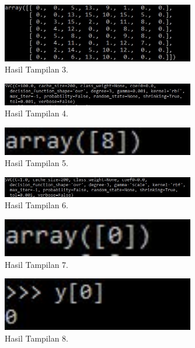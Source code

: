\begin{figure}[ht]\centerline{\includegraphics[width=0.75\textwidth]{figures/huda/12.JPG}}\caption{Hasil Tampilan 3.}\end{figure}
\begin{figure}[ht]\centerline{\includegraphics[width=0.75\textwidth]{figures/huda/13.JPG}}\caption{Hasil Tampilan 4.}\end{figure}
\begin{figure}[ht]\centerline{\includegraphics[width=0.75\textwidth]{figures/huda/14.JPG}}\caption{Hasil Tampilan 5.}\end{figure}
\begin{figure}[ht]\centerline{\includegraphics[width=0.75\textwidth]{figures/huda/15.JPG}}\caption{Hasil Tampilan 6.}\end{figure}
\begin{figure}[ht]\centerline{\includegraphics[width=0.75\textwidth]{figures/huda/16.JPG}}\caption{Hasil Tampilan 7.}\end{figure}
\begin{figure}[ht]\centerline{\includegraphics[width=0.75\textwidth]{figures/huda/17.JPG}}\caption{Hasil Tampilan 8.}\end{figure}
